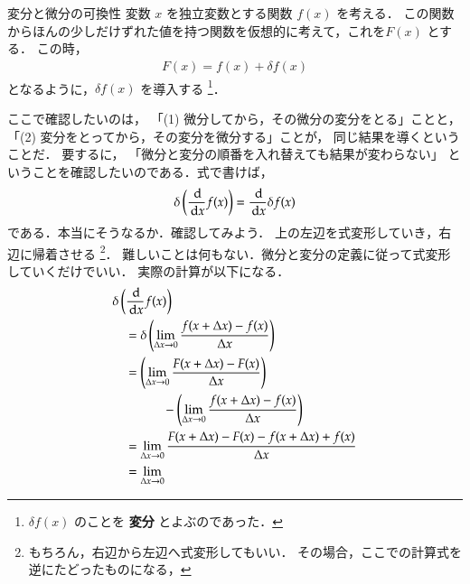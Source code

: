         \begin{memo}{変分と微分の可換性}
            変数 $x$ を独立変数とする関数 $f(x)$ を考える．
            この関数からほんの少しだけずれた値を持つ関数を仮想的に考えて，これを$F(x)$ とする．
            この時，
                \begin{align}\label{eq:henbun1}
                    F(x) = f(x) + \delta f(x)
                \end{align}
            となるように，$\delta f(x)$ を導入する
                \footnote{
                    $\delta f(x)$ のことを \textbf{変分} とよぶのであった．
                }．

            ここで確認したいのは，
                    「(1) 微分してから，その微分の変分をとる」ことと，
                    「(2) 変分をとってから，その変分を微分する」ことが，
            同じ結果を導くということだ． 要するに，
                「微分と変分の順番を入れ替えても結果が変わらない」
            ということを確認したいのである．式で書けば，
                \begin{equation*}
                    \delta \left( \frac{\,\mathrm{d}}{\,\mathrm{d} x} f(x) \right) = \frac{\,\mathrm{d}}{\,\mathrm{d} x}\delta f(x)
                \end{equation*}
            である．本当にそうなるか．確認してみよう．
            上の左辺を式変形していき，右辺に帰着させる
                \footnote{
                    もちろん，右辺から左辺へ式変形してもいい．
                    その場合，ここでの計算式を逆にたどったものになる，
                }．
            難しいことは何もない．微分と変分の定義に従って式変形していくだけでいい．
            実際の計算が以下になる．
                \begin{align*}
                    \mbox{} &         \delta \left( \frac{\df}{\df x} f(x) \right) \\
                            & \quad = \delta \left( \lim_{\Delta x \to 0} \frac{f(x+\Delta x) - f(x)}{\Delta x} \right) \\
                            & \quad = \left( \lim_{\Delta x \to 0} \frac{F(x+\Delta x) - F(x)}{\Delta x} \right) \\
                            &         \qquad \qquad  - \left( \lim_{\Delta x \to 0} \frac{f(x+\Delta x) - f(x)}{\Delta x} \right) \\
                            & \quad = \lim_{\Delta x \to 0}
                                      \frac{F(x+\Delta x) - F(x) - f(x+\Delta x) +  f(x) }{\Delta x} \\
                            & \quad = \lim_{\Delta x \to 0}

\end{align*}
\end{memo}
